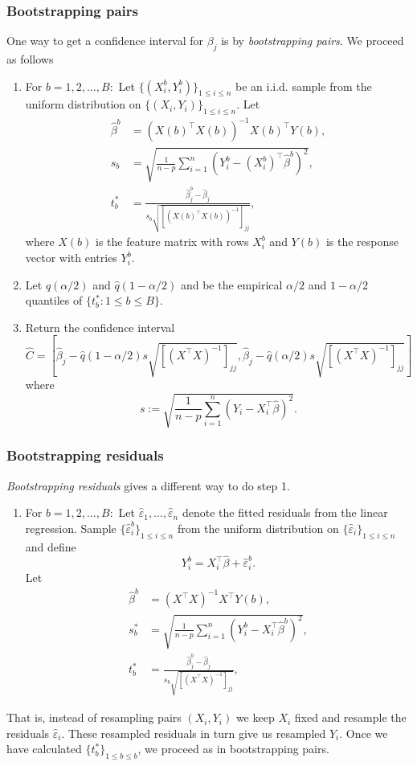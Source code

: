 \subsubsection*{Bootstrapping pairs}
One way to get a confidence interval for $\beta_j$ is by \emph{bootstrapping pairs}. We proceed as follows
\begin{enumerate}
\item
 For $b=1,2,\dots,B:$ Let $\{(X^b_i,Y^b_i)\}_{1 \le i \le n}$ be an i.i.d. sample from the uniform distribution on $\{(X_i,Y_i)\}_{1 \le i \le n}$. Let 
 \begin{align*}
 \hat{\beta}^b &= (X(b)^\top X(b))^{-1} X(b)^\top Y(b), \\
 s_b &= \sqrt{\frac{1}{n-p} \sum_{i=1}^n (Y_i^b - (X_i^b)^\top\hat{\beta}^b)^2},\\
 t_b^* &= \frac{\hat{\beta}^b_j - \hat{\beta}_j}{s_b\sqrt{[(X(b)^\top X(b))^{-1}]_{jj}} },
 \end{align*}
 where $X(b)$ is the feature matrix with rows $X_i^b$ and $Y(b)$ is the response vector with entries $Y_i^b$. 
\item
  Let $\hat{q}(\alpha/2)$ and $\hat{q}(1-\alpha/2)$ and be the empirical $\alpha/2$ and $1-\alpha/2$ quantiles of $\{t_b^* : 1 \le b \le B\}$. 
  \item
  Return the confidence interval \[\hat{C} = [\hat{\beta}_j - \hat{q}(1-\alpha/2)s\sqrt{[(X^\top X)^{-1}]_{jj}}  , \hat{\beta}_j - \hat{q}(\alpha/2) s\sqrt{[(X^\top X)^{-1}]_{jj}}]\] where
  \[
  s := \sqrt{\frac{1}{n-p} \sum_{i=1}^n (Y_i - X_i^\top \hat{\beta})^2}.
  \]
\end{enumerate}

\subsubsection*{Bootstrapping residuals} 

\emph{Bootstrapping residuals} gives a different way to do step 1. 
\begin{enumerate}[label={\arabic*$'.$},start=1]
\item
 For $b=1,2,\dots,B:$ Let $\hat{\varepsilon}_1,\dots,\hat{\varepsilon}_n$ denote the fitted residuals from the linear regression. Sample $\{\hat{\varepsilon}_i^b\}_{1 \le i \le n}$ from the uniform distribution on $\{\hat{\varepsilon}_i\}_{1 \le i \le n}$ and define
 \[
 Y_i^b = X_i^\top\hat{\beta} + \hat{\varepsilon}^b_i.
 \]
Let 
\begin{align*}
    \hat{\beta}^b &= (X^\top X)^{-1} X^\top Y(b), \\
    s_b^* &= \sqrt{\frac{1}{n-p} \sum_{i=1}^n (Y_i^b - X_i^\top\hat{\beta}^b)^2},\\
    t_b^* &= \frac{\hat{\beta}^b_j - \hat{\beta}_j}{s_b\sqrt{[(X^\top X)^{-1}]_{jj}} },
    \end{align*}
\end{enumerate}
That is, instead of resampling pairs $(X_i,Y_i)$ we keep $X_i$ fixed and resample the residuals $\hat{\varepsilon}_i$. These resampled residuals in turn give us resampled $Y_i$. Once we have calculated $\{t_b^*\}_{1 \le b \le b}$, we proceed as in bootstrapping pairs. 

